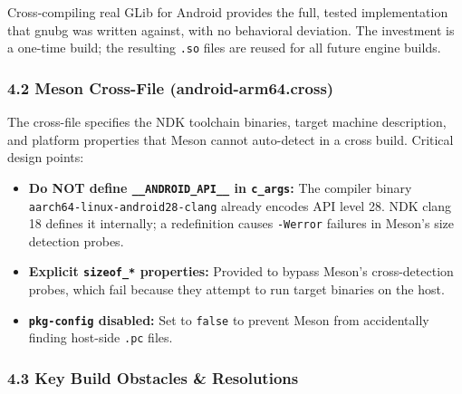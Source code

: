 \documentclass[11pt,a4paper]{article}
\providecommand{\tightlist}{\setlength{\itemsep}{2pt}\setlength{\parskip}{0pt}}
\begin{document}
Cross-compiling real GLib for Android provides the full, tested
implementation that gnubg was written against, with no behavioral
deviation. The investment is a one-time build; the resulting
\texttt{.so} files are reused for all future engine builds.

\subsubsection{4.2 Meson Cross-File
(android-arm64.cross)}\label{meson-cross-file-android-arm64.cross}

The cross-file specifies the NDK toolchain binaries, target machine
description, and platform properties that Meson cannot auto-detect in a
cross build. Critical design points:

\begin{itemize}
\tightlist
\item
  \textbf{Do NOT define \texttt{\_\_ANDROID\_API\_\_} in
  \texttt{c\_args}:} The compiler binary
  \texttt{aarch64-linux-android28-clang} already encodes API level 28.
  NDK clang 18 defines it internally; a redefinition causes
  \texttt{-Werror} failures in Meson's size detection probes.
\item
  \textbf{Explicit \texttt{sizeof\_*} properties:} Provided to bypass
  Meson's cross-detection probes, which fail because they attempt to run
  target binaries on the host.
\item
  \textbf{\texttt{pkg-config} disabled:} Set to \texttt{false} to
  prevent Meson from accidentally finding host-side \texttt{.pc} files.
\end{itemize}

\subsubsection{4.3 Key Build Obstacles \&
Resolutions}\label{key-build-obstacles-resolutions}
\end{document}
